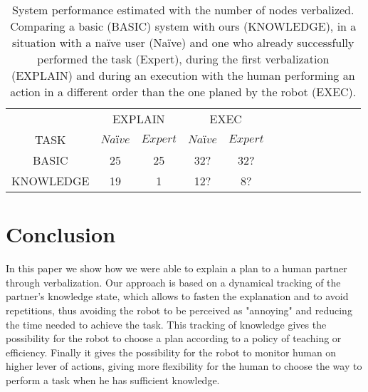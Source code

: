 \documentclass{llncs}
\begin{document}
\begin{table}
 \vspace{-10pt}
\centering
\scriptsize
\renewcommand{\arraystretch}{1.2}
\begin{tabular}{c|*{3}{c|c||}*{2}{c|c|c}}
\multicolumn{1}{c}{} & \multicolumn{2}{c}{EXPLAIN} & \multicolumn{2}{c}{EXEC} \\
TASK & $Naïve$ & $Expert$
	 & $Naïve$ & $Expert$  \\ 
\hline
 	BASIC   & 25 & 25
            & 32? & 32? \\
    \hline
   	KNOWLEDGE	& 19 & 1 
                & 12? & 8? \\
\end{tabular}
\caption{System performance estimated with the number of nodes verbalized. Comparing a basic (BASIC) system with ours (KNOWLEDGE), in a situation with a na\"ive user (Na\"ive) and one who already successfully performed the task (Expert), during the first verbalization (EXPLAIN) and during an execution with the human performing an action in a different order than the one planed by the robot (EXEC).}
 \label{table:perfs}    
 \vspace{-20pt}
\end{table}









\section{Conclusion}
In this paper we show how we were able to explain a plan to a human partner through verbalization.
Our approach is based on a dynamical tracking of the partner's knowledge state, which allows to 
fasten the explanation and to avoid repetitions, thus avoiding the robot to be perceived as "annoying" and reducing the time needed to achieve the task.
This tracking of knowledge gives the possibility for the robot to choose a plan according to a policy of teaching or efficiency. Finally it
gives the possibility for the robot to monitor human on higher lever of actions, giving more flexibility for the human to choose the way to perform a task when he has sufficient knowledge.
\end{document}
